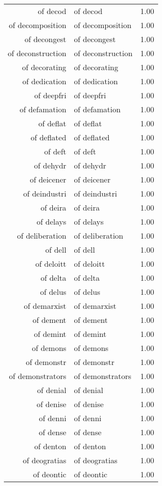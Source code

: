 \begin{table}[ht]
\begin{tabular}{rlr}
  of decod & of decod & 1.00 \\ 
  of decomposition & of decomposition & 1.00 \\ 
  of decongest & of decongest & 1.00 \\ 
  of deconstruction & of deconstruction & 1.00 \\ 
  of decorating & of decorating & 1.00 \\ 
  of dedication & of dedication & 1.00 \\ 
  of deepfri & of deepfri & 1.00 \\ 
  of defamation & of defamation & 1.00 \\ 
  of deflat & of deflat & 1.00 \\ 
  of deflated & of deflated & 1.00 \\ 
  of deft & of deft & 1.00 \\ 
  of dehydr & of dehydr & 1.00 \\ 
  of deicener & of deicener & 1.00 \\ 
  of deindustri & of deindustri & 1.00 \\ 
  of deira & of deira & 1.00 \\ 
  of delays & of delays & 1.00 \\ 
  of deliberation & of deliberation & 1.00 \\ 
  of dell & of dell & 1.00 \\ 
  of deloitt & of deloitt & 1.00 \\ 
  of delta & of delta & 1.00 \\ 
  of delus & of delus & 1.00 \\ 
  of demarxist & of demarxist & 1.00 \\ 
  of dement & of dement & 1.00 \\ 
  of demint & of demint & 1.00 \\ 
  of demons & of demons & 1.00 \\ 
  of demonstr & of demonstr & 1.00 \\ 
  of demonstrators & of demonstrators & 1.00 \\ 
  of denial & of denial & 1.00 \\ 
  of denise & of denise & 1.00 \\ 
  of denni & of denni & 1.00 \\ 
  of dense & of dense & 1.00 \\ 
  of denton & of denton & 1.00 \\ 
  of deogratias & of deogratias & 1.00 \\ 
  of deontic & of deontic & 1.00 \\ 

\end{tabular}
\end{table}
